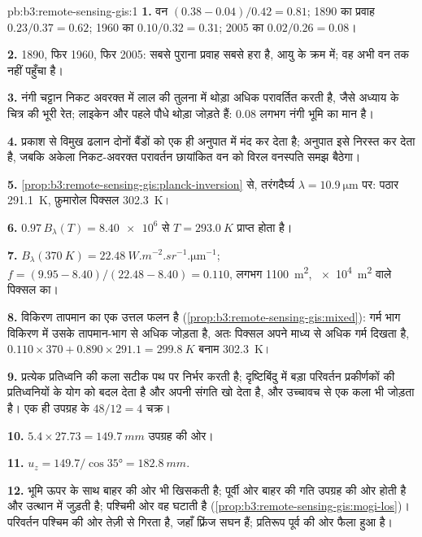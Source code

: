\begin{solution}{pb:b3:remote-sensing-gis:1}
\textbf{1.} वन $(0.38 - 0.04)/0.42 = 0.81$; 1890 का प्रवाह $0.23/0.37 =
0.62$; 1960 का $0.10/0.32 = 0.31$; 2005 का $0.02/0.26 = 0.08$।

\textbf{2.} 1890, फिर 1960, फिर 2005: सबसे पुराना प्रवाह सबसे हरा है,
आयु के क्रम में; वह अभी वन तक नहीं पहुँचा है।

\textbf{3.} नंगी चट्टान निकट अवरक्त में लाल की तुलना में थोड़ा अधिक परावर्तित करती है,
जैसे अध्याय के चित्र की भूरी रेत; लाइकेन और पहले
पौधे थोड़ा जोड़ते हैं: 0.08 लगभग नंगी भूमि का मान है।

\textbf{4.} प्रकाश से विमुख ढलान दोनों बैंडों को एक ही अनुपात में मंद कर देता है;
अनुपात इसे निरस्त कर देता है, जबकि अकेला निकट-अवरक्त परावर्तन
छायांकित वन को विरल वनस्पति समझ बैठेगा।

\textbf{5.} \cref{prop:b3:remote-sensing-gis:planck-inversion} से, तरंगदैर्घ्य
$\lambda = \qty{10.9}{\micro\metre}$ पर: पठार \qty{291.1}{K}, 
फ़ुमारोल पिक्सल \qty{302.3}{K}।

\textbf{6.} $0.97\,B_\lambda(T) = \num{8.40e6}$ से $T = \qty{293.0}{K}$ प्राप्त होता है।

\textbf{7.} $B_\lambda(\qty{370}{K}) =
\qty{22.48}{W.m^{-2}.sr^{-1}.\micro\metre^{-1}}$; $f = (9.95 - 8.40)/(22.48
- 8.40) = 0.110$, लगभग \qty{1100}{m^2}, \qty{e4}{m^2} वाले पिक्सल का।

\textbf{8.} विकिरण तापमान का एक उत्तल फलन है
(\cref{prop:b3:remote-sensing-gis:mixed}): गर्म भाग विकिरण में उसके तापमान-भाग से अधिक जोड़ता है,
अतः पिक्सल अपने माध्य से अधिक गर्म दिखता है,
$0.110\times370 + 0.890\times291.1 = \qty{299.8}{K}$ बनाम
\qty{302.3}{K}।

\textbf{9.} प्रत्येक प्रतिध्वनि की कला सटीक पथ पर निर्भर करती है; दृष्टिबिंदु में बड़ा
परिवर्तन प्रकीर्णकों की प्रतिध्वनियों के योग को बदल देता है और
 अपनी संगति खो देता है, और उच्चावच से एक कला भी जोड़ता है।
एक ही उपग्रह के $48/12 = 4$ चक्र।

\textbf{10.} $5.4\times27.73 = \qty{149.7}{mm}$ उपग्रह की ओर।

\textbf{11.} $u_z = 149.7/\cos\ang{35} = \qty{182.8}{mm}$.

\textbf{12.} भूमि ऊपर के साथ बाहर की ओर भी खिसकती है; पूर्वी ओर
बाहर की गति उपग्रह की ओर होती है और उत्थान में जुड़ती है; पश्चिमी ओर
वह घटाती है (\cref{prop:b3:remote-sensing-gis:mogi-los})। परिवर्तन
पश्चिम की ओर तेज़ी से गिरता है, जहाँ फ़्रिंज सघन हैं; प्रतिरूप
पूर्व की ओर फैला हुआ है।


\end{solution}
